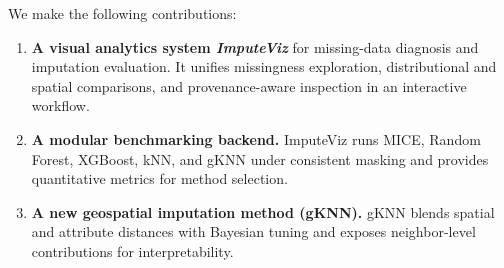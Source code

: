 \documentclass[review]{vgtc}
\begin{document}
We make the following contributions:
\begin{enumerate}[label=\textbf{C\arabic*}, leftmargin=*]
  \item \textbf{A visual analytics system \textit{ImputeViz}} for missing-data diagnosis and imputation evaluation.
        It unifies missingness exploration, distributional and spatial comparisons, and provenance-aware inspection in an interactive workflow.

  \item \textbf{A modular benchmarking backend.}
        ImputeViz runs MICE, Random Forest, XGBoost, kNN, and gKNN under consistent masking and provides quantitative metrics for method selection.

  \item \textbf{A new geospatial imputation method (gKNN).}
        gKNN blends spatial and attribute distances with Bayesian tuning and exposes neighbor-level contributions for interpretability.
\end{enumerate}

\end{document}
